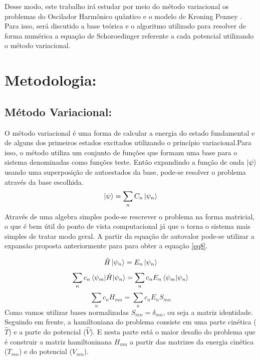 \documentclass[11pt]{article}
\begin{document}
Desse modo, este trabalho irá estudar por meio do método variacional os problemas do Oscilador Harmônico quântico e o modelo de Kroning Penney . Para isso, será discutido a base teórica e o algoritmo utilizado para resolver de forma numérica a equação de Schoroedinger referente a cada potencial utilizando o método variacional.



\section{Metodologia:}
\label{sec:orgb3ef600}
\subsection{Método Variacional:}
\label{sec:orga51ca98}
O método variacional é uma forma de calcular a energia do estado fundamental e de alguns dos primeiros estados excitados utilizando o princípio variacional.Para isso, o método utiliza um conjunto de funções que formam uma base para o sistema denominadas como funções teste. Então expandindo a função de onda \(\ket{\psi}\) usando uma superposição de autoestados da base, pode-se resolver o problema através da base escolhida.
\begin{equation}
\label{eq5}
\ket{\psi} = \sum_{n} C_n \ket{\psi_n}
\end{equation}
Através de uma algebra simples pode-se rescrever o problema na forma matricial, o que é bem útil do ponto de vista computacional já que o torna o sistema mais simples de tratar modo geral. A partir da equação de autovalor pode-se utilizar a expansão proposta anteriormente para para obter a equação \ref{eq8}.

\begin{equation}
\label{eq6}
\hat{H} \ket{\psi_n} = E_n \ket{\psi_n}
\end{equation}
\begin{equation}
\label{eq7}
\sum_{n} c_n \braket{\psi_m|\hat{H} |\psi_n} = \sum_{n} c_n E_n \braket{\psi_m|\psi_n}
\end{equation}
\begin{equation}
\label{eq8}
\sum_{n} c_n H_{mn}  = \sum_{n} c_n E_n S_{mn}
\end{equation}
Como vamos utilizar bases normalizadas  \(S_{mn} = \delta_{mn}\), ou seja a matriz identidade. Seguindo em frente, a hamiltoniana do problema consiste em uma parte cinética (\(\hat{T}\)) e a parte do potencial (\(\hat{V}\)). E nesta parte está o maior desafio do problema que é construir a matriz hamiltoninana \(H_{mn}\) a partir das matrizes da energia cinética (\(T_{mn}\)) e do potencial (\(V_{mn}\)).
\end{document}
